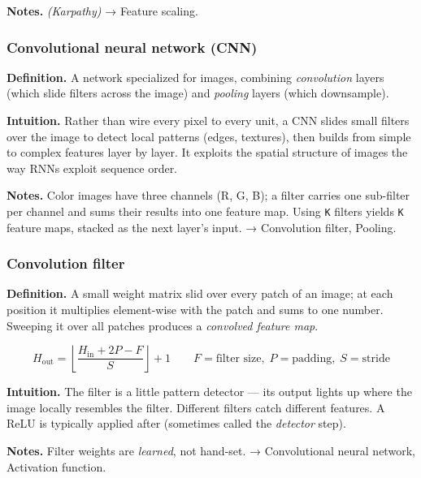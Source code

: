 \documentclass[
  10pt,
  letterpaper,
  onecolumn]{article}
\begin{document}
\textbf{Notes.} \emph{(Karpathy)} → Feature scaling.

\hypertarget{convolutional-neural-network-cnn}{%
\subsubsection{Convolutional neural network
(CNN)}\label{convolutional-neural-network-cnn}}

\textbf{Definition.} A network specialized for images, combining
\emph{convolution} layers (which slide filters across the image) and
\emph{pooling} layers (which downsample).

\textbf{Intuition.} Rather than wire every pixel to every unit, a CNN
slides small filters over the image to detect local patterns (edges,
textures), then builds from simple to complex features layer by layer.
It exploits the spatial structure of images the way RNNs exploit
sequence order.

\textbf{Notes.} Color images have three channels (R, G, B); a filter
carries one sub-filter per channel and sums their results into one
feature map. Using \texttt{K} filters yields \texttt{K} feature maps,
stacked as the next layer's input. → Convolution filter, Pooling.

\hypertarget{convolution-filter}{%
\subsubsection{Convolution filter}\label{convolution-filter}}

\textbf{Definition.} A small weight matrix slid over every patch of an
image; at each position it multiplies element-wise with the patch and
sums to one number. Sweeping it over all patches produces a
\emph{convolved feature map}.

\begin{equation*}
H_{\text{out}}=\left\lfloor\frac{H_{\text{in}}+2P-F}{S}\right\rfloor+1
\qquad F=\text{filter size},\;P=\text{padding},\;S=\text{stride}
\end{equation*}

\textbf{Intuition.} The filter is a little pattern detector --- its
output lights up where the image locally resembles the filter. Different
filters catch different features. A ReLU is typically applied after
(sometimes called the \emph{detector} step).

\textbf{Notes.} Filter weights are \emph{learned}, not hand-set. →
Convolutional neural network, Activation function.
\end{document}
